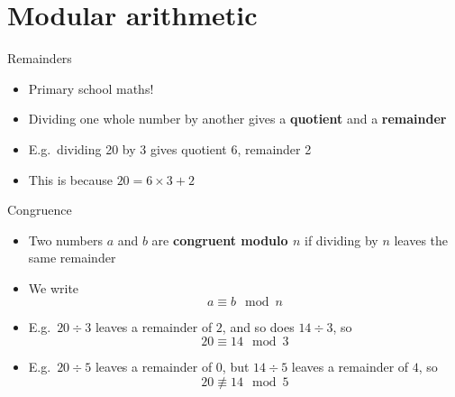 \part{Modular arithmetic}
\frame{\partpage}

\begin{frame}{Remainders}
	\begin{itemize}
		\pause\item Primary school maths!
		\pause\item Dividing one whole number by another gives a \textbf{quotient} and a \textbf{remainder}
		\pause\item E.g.\ dividing 20 by 3 gives quotient 6, remainder 2
		\pause\item This is because $20 = 6 \times 3 + 2$
	\end{itemize}
\end{frame}

\begin{frame}{Congruence}
	\begin{itemize}
		\pause\item Two numbers $a$ and $b$ are \textbf{congruent modulo $n$} if dividing by $n$ leaves the same remainder
		\pause\item We write $$a \equiv b \mod n$$
		\pause\item E.g.\ $20 \div 3$ leaves a remainder of $2$, and so does $14 \div 3$, so
			$$20 \equiv 14 \mod 3$$
		\pause\item E.g.\ $20 \div 5$ leaves a remainder of $0$, but $14 \div 5$ leaves a remainder of $4$, so
			$$20 \not\equiv 14 \mod 5$$
	\end{itemize}
\end{frame}
